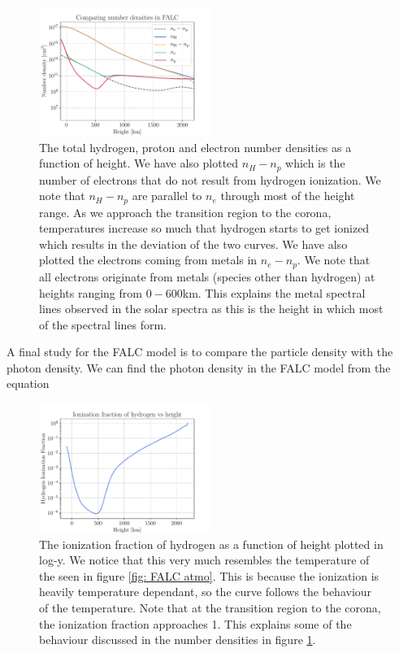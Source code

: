 \documentclass[a4paper,11.5pt,]{article}
\begin{document}
\begin{multicols}{2}
\begin{figure}[H]
    \centering
    \includegraphics[width = 0.5\textwidth]{figures/1.2/FALCnumberDensity.pdf}
    \caption{The total hydrogen, proton and electron number densities as a function of height. We have also plotted $n_H - n_p$ which is the number of electrons that do not result from hydrogen ionization. We note that $n_H - n_p$ are parallel to $n_e$ through most of the height range. As we approach the transition region to the corona, temperatures increase so much that hydrogen starts to get ionized which results in the deviation of the two curves. We have also plotted the electrons coming from metals in $n_e - n_p$.
    We note that all electrons originate from metals (species other than hydrogen) at heights ranging from $0 - 600$km. This explains the metal spectral lines observed in the solar spectra as this is the height in which most of the spectral lines form. }
    \label{fig: FALC number densities}
\end{figure}

A final study for the FALC model is to compare the particle density with the photon density. We can find the photon density in the FALC model from the equation
\begin{figure}[H]
    \centering
    \includegraphics[width = 0.5\textwidth]{figures/1.2/FALCIonizationFraction.pdf}
    \caption{The ionization fraction of hydrogen as a function of height plotted in log-y. We notice that this very much resembles the temperature of the seen in figure \ref{fig: FALC atmo}. This is because the ionization is heavily temperature dependant, so the curve follows the behaviour of the temperature. Note that at the transition region to the corona, the ionization fraction approaches 1. This explains some of the behaviour discussed in the number densities in figure \ref{fig: FALC number densities}.}
    \label{fig: FALC ionization}
\end{figure}



\end{multicols}
\end{document}
